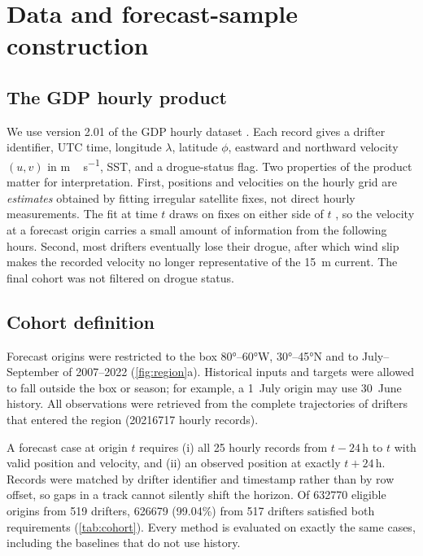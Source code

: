 \section{Data and forecast-sample construction}\label{sec:data}

\subsection{The GDP hourly product}
We use version 2.01 of the GDP hourly dataset \citep{gdpdata2022}. Each record gives a drifter identifier, UTC time, longitude $\lambda$, latitude $\phi$, eastward and northward velocity $(u,v)$ in \si{m\,s^{-1}}, SST, and a drogue-status flag. Two properties of the product matter for interpretation. First, positions and velocities on the hourly grid are \emph{estimates} obtained by fitting irregular satellite fixes, not direct hourly measurements. The fit at time $t$ draws on fixes on either side of $t$ \citep{elipot2016}, so the velocity at a forecast origin carries a small amount of information from the following hours. Second, most drifters eventually lose their drogue, after which wind slip makes the recorded velocity no longer representative of the \SI{15}{m} current. The final cohort was not filtered on drogue status.

\subsection{Cohort definition}
Forecast origins were restricted to the box \ang{80}--\ang{60}W, \ang{30}--\ang{45}N and to July--September of 2007--2022 (\cref{fig:region}a). Historical inputs and targets were allowed to fall outside the box or season; for example, a 1~July origin may use 30~June history. All observations were retrieved from the complete trajectories of drifters that entered the region (\num{20216717} hourly records).

A forecast case at origin $t$ requires (i) all 25 hourly records from $t-24$\,h to $t$ with valid position and velocity, and (ii) an observed position at exactly $t+24$\,h. Records were matched by drifter identifier and timestamp rather than by row offset, so gaps in a track cannot silently shift the horizon. Of \num{632770} eligible origins from 519 drifters, \num{626679} (99.04\%) from 517 drifters satisfied both requirements (\cref{tab:cohort}). Every method is evaluated on exactly the same cases, including the baselines that do not use history.

